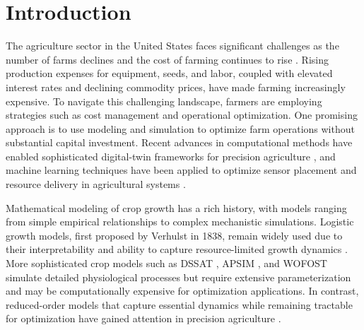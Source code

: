 \documentclass[pdflatex,sn-mathphys-num]{sn-jnl}
\begin{document}
\maketitle

\section{Introduction}\label{sec:intro}

The agriculture sector in the United States faces significant challenges as the number of farms declines and the cost of farming continues to rise \cite{usda-farm-income}. Rising production expenses for equipment, seeds, and labor, coupled with elevated interest rates and declining commodity prices, have made farming increasingly expensive. To navigate this challenging landscape, farmers are employing strategies such as cost management and operational optimization. One promising approach is to use modeling and simulation to optimize farm operations without substantial capital investment. Recent advances in computational methods have enabled sophisticated digital-twin frameworks for precision agriculture \cite{zohdi2024digitaltwin,mengi2023indoorfarming,isied2022digitaltwin,mengi2023agrivoltaics}, and machine learning techniques have been applied to optimize sensor placement and resource delivery in agricultural systems \cite{goodrich2022sensors,tagkopoulos2024aifs,betancourt2024aerial}.

Mathematical modeling of crop growth has a rich history, with models ranging from simple empirical relationships to complex mechanistic simulations. Logistic growth models, first proposed by Verhulst in 1838, remain widely used due to their interpretability and ability to capture resource-limited growth dynamics \cite{verhulst1838}. More sophisticated crop models such as DSSAT \cite{jones2003dssat}, APSIM \cite{holzworth2014apsim}, and WOFOST \cite{wofost} simulate detailed physiological processes but require extensive parameterization and may be computationally expensive for optimization applications. In contrast, reduced-order models that capture essential dynamics while remaining tractable for optimization have gained attention in precision agriculture \cite{precision-ag-review}.
\end{document}
